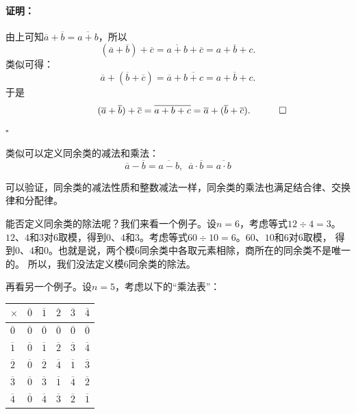 \documentclass[12pt,UTF8]{ctexbook}
\newenvironment{proof2}{\paragraph{\textbf{证明：}}}{\hfill$\square$}
\begin{document}
\begin{proof2}
    由上可知$ \overline{a} + \overline{b} = \overline{a + b}$，所以
    $$ (\overline{a} + \overline{b}) + \overline{c} = \overline{a + b}+ \overline{c} = \overline{a + b + c}.$$
    类似可得：
    $$ \overline{a} + (\overline{b} + \overline{c}) = \overline{a}+ \overline{b + c} = \overline{a + b + c}.$$
    于是
    $$ \quad \quad \quad (\overline{a} + \overline{b}) + \overline{c}  = \overline{a + b + c} = \overline{a} + (\overline{b} + \overline{c}). \quad \qedhere$$
\end{proof2}

类似可以定义同余类的减法和乘法：
$$ \overline{a} - \overline{b} = \overline{a - b}, \,\,\, \overline{a} \cdot \overline{b} = \overline{a \cdot b}$$

可以验证，同余类的减法性质和整数减法一样，同余类的乘法也满足结合律、交换律和分配律。

能否定义同余类的除法呢？我们来看一个例子。设$n=6$，考虑等式$12 \div 4 = 3$。
$12$、$4$和$3$对$6$取模，得到$0$、$4$和$3$。考虑等式$60 \div 10 = 6$。$60$、$10$和$6$对$6$取模，
得到$0$、$4$和$0$。也就是说，两个模$6$同余类中各取元素相除，商所在的同余类不是唯一的。
所以，我们没法定义模$6$同余类的除法。

再看另一个例子。设$n=5$，考虑以下的“乘法表”：
\begin{center}
    \begin{tabular}{ | p{2em}<{\centering} | p{2em}<{\centering} | p{2em}<{\centering} | p{2em}<{\centering} | p{2em}<{\centering} | p{2em}<{\centering} | }
        \hline
            $\times$   & $\overline{0}$ & $\overline{1}$ & $\overline{2}$ & $\overline{3}$ & $\overline{4}$ \\ [0.5ex] 
        \hline
        $\overline{0}$ & $\overline{0}$ & $\overline{0}$ & $\overline{0}$ & $\overline{0}$ & $\overline{0}$ \\  
        \hline
        $\overline{1}$ & $\overline{0}$ & $\overline{1}$ & $\overline{2}$ & $\overline{3}$ & $\overline{4}$ \\
        \hline
        $\overline{2}$ & $\overline{0}$ & $\overline{2}$ & $\overline{4}$ & $\overline{1}$ & $\overline{3}$ \\
        \hline
        $\overline{3}$ & $\overline{0}$ & $\overline{3}$ & $\overline{1}$ & $\overline{4}$ & $\overline{2}$ \\
        \hline 
        $\overline{4}$ & $\overline{0}$ & $\overline{4}$ & $\overline{3}$ & $\overline{2}$ & $\overline{1}$ \\
        \hline
    \end{tabular}
\end{center}
\end{document}
